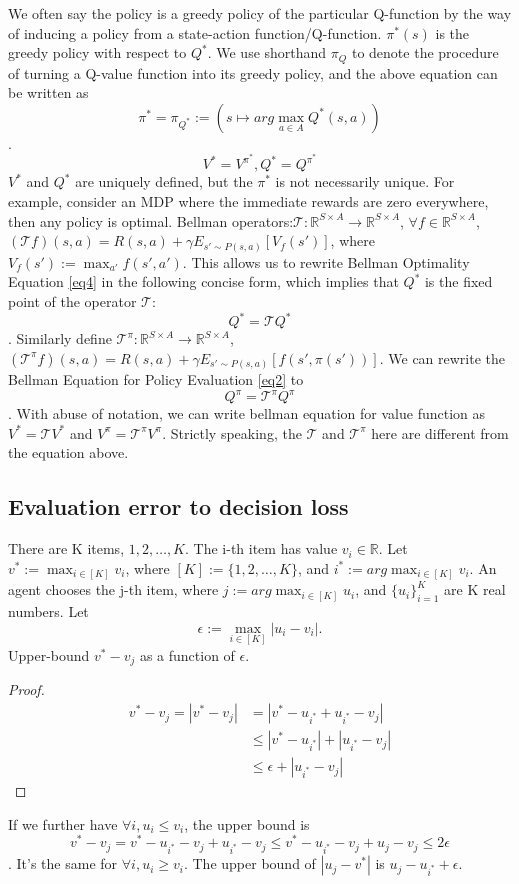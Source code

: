 \documentclass{report}
\begin{document}
We often say the policy is a greedy policy of the particular Q-function by the way of inducing a policy from a state-action function/Q-function. $\pi^*(s)$ is the greedy policy with respect to $Q^*$. We use shorthand $\pi_Q$ to denote the procedure of turning a Q-value function into its greedy policy, and the above equation can be written as \[\pi^*=\pi_{Q^*}:=(s \mapsto arg\max_{a\in A}Q^*(s,a))\].
\[
V^*=V^{\pi^*},
Q^*=Q^{\pi^*}
\]
$V^*$ and $Q^*$ are uniquely defined, but the $\pi^*$ is not necessarily unique. For example, consider an MDP where the immediate rewards are zero everywhere, then any policy is optimal. 
Bellman operators:$\mathcal{T}: \mathbb{R}^{S\times A}\rightarrow \mathbb{R}^{S\times A}$, $\forall f \in \mathbb{R}^{S\times A}$, $(\mathcal{T}f)(s,a)=R(s,a)+\gamma E_{s'\sim P(s,a)}[V_f(s')]$, where $V_f(s'):=\max_{a'}f(s',a')$. This allows us to rewrite Bellman Optimality Equation \ref{eq4} in the following concise form, which implies that $Q^*$ is the fixed point of the operator $\mathcal{T}$:\[Q^*=\mathcal{T}Q^*\]. Similarly define $\mathcal{T}^{\pi}: \mathbb{R}^{S\times A}\rightarrow \mathbb{R}^{S\times A}$, $(\mathcal{T}^{\pi}f)(s,a)=R(s,a)+\gamma E_{s'\sim P(s,a)}[f(s',\pi(s'))]$. We can rewrite the Bellman Equation for Policy Evaluation \ref{eq2} to \[Q^{\pi}=\mathcal{T}^{\pi}Q^{\pi}\]. With abuse of notation, we can write bellman equation for value function as $V^{*}=\mathcal{T}V^*$ and $V^{\pi}=\mathcal{T}^{\pi}V^{\pi}$. Strictly speaking, the $\mathcal{T}$ and $\mathcal{T}^{\pi}$ here are different from the equation above.

\subsection{Evaluation error to decision loss}
There are K items, $1, 2,\hdots, K$. The i-th item has value $v_i \in \mathbb{R}$. Let $v^*:=\max_{i \in [K]}v_i$, where $[K]:=\{1,2,\hdots,K\}$, and $i^*:=arg\max_{i \in [K]}v_i$. An agent chooses the j-th item, where $j:=arg\max_{i \in [K]}u_i$, and $\{u_i\}_{i=1}^{K}$ are K real numbers. Let \[
\epsilon:=\max_{i \in [K]}|u_i-v_i|.
\]Upper-bound $v^*-v_j$ as a function of $\epsilon$.
\begin{proof}
    \begin{equation*}
        \begin{split}
            v^*-v_j = |v^*-v_j|  &= |v^*-u_{i^*}+u_{i^*}-v_j|\\
            &\leq |v^*-u_{i^*}| + |u_{i^*}-v_j|\\
            &\leq \epsilon + |u_{i^*}-v_j|
        \end{split}
    \end{equation*}
\end{proof}
If we further have $\forall i, u_i \leq v_i$, the upper bound is \[
v^*-v_j = v^*-u_{i^*}-v_j+u_{i^*}-v_j \leq v^*-u_{i^*}-v_j+u_j-v_j \leq 2\epsilon
\]. It's the same for $\forall i, u_i \geq v_i$. The upper bound of $|u_j-v^*|$ is $u_j-u_{i^*}+\epsilon$.
\end{document}
